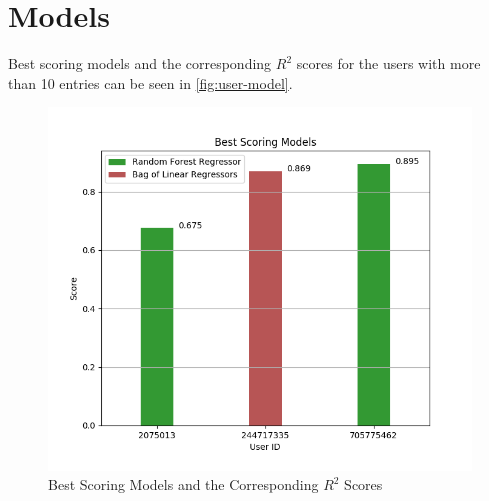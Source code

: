 \newpage
\section{Models}
Best scoring models and the corresponding $R^2$ scores for the users with more than 10 entries can be seen in \autoref{fig:user-model}.
\begin{figure}[htbp]
  \centering
  \captionsetup{width=.9\linewidth}
  \includegraphics[scale=0.6]{figures/user-model}
  \caption{Best Scoring Models and the Corresponding $R^2$ Scores}
  \label{fig:user-model}
\end{figure}


